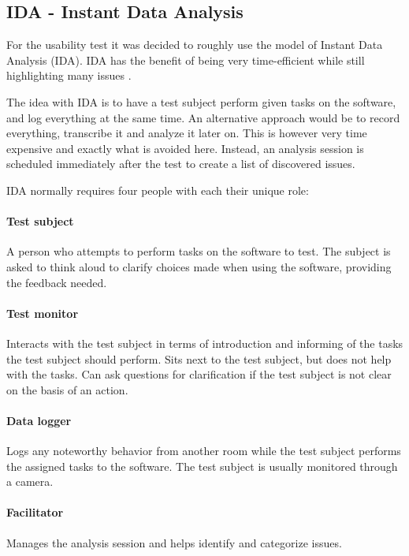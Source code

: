 \subsection{IDA - Instant Data Analysis}\label{subsec:IDA}
For the usability test it was decided to roughly use the model of Instant Data Analysis (IDA). IDA has the benefit of being very time-efficient while still highlighting many issues \cite{IDA}.

The idea with IDA is to have a test subject perform given tasks on the software, and log everything at the same time. An alternative approach would be to record everything, transcribe it and analyze it later on. This is however very time expensive and exactly what is avoided here.
Instead, an analysis session is scheduled immediately after the test to create a list of discovered issues.

IDA normally requires four people with each their unique role:

\paragraph{Test subject} A person who attempts to perform tasks on the software to test. The subject is asked to think aloud to clarify choices made when using the software, providing the feedback needed.

\paragraph{Test monitor} Interacts with the test subject in terms of introduction and informing of the tasks the test subject should perform. Sits next to the test subject, but does not help with the tasks. Can ask questions for clarification if the test subject is not clear on the basis of an action.

\paragraph{Data logger} Logs any noteworthy behavior from another room while the test subject performs the assigned tasks to the software. The test subject is usually monitored through a camera.

\paragraph{Facilitator} Manages the analysis session and helps identify and categorize issues.
